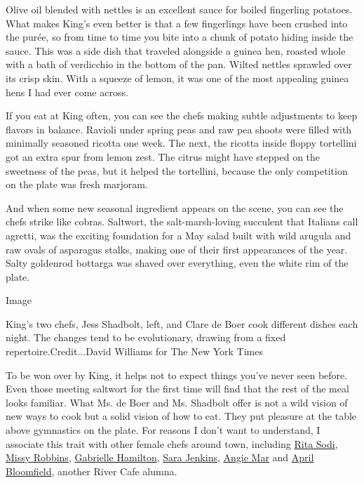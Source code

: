 Olive oil blended with nettles is an excellent sauce for boiled
fingerling potatoes. What makes King's even better is that a few
fingerlings have been crushed into the purée, so from time to time you
bite into a chunk of potato hiding inside the sauce. This was a side
dish that traveled alongside a guinea hen, roasted whole with a bath of
verdicchio in the bottom of the pan. Wilted nettles sprawled over its
crisp skin. With a squeeze of lemon, it was one of the most appealing
guinea hens I had ever come across.

If you eat at King often, you can see the chefs making subtle
adjustments to keep flavors in balance. Ravioli under spring peas and
raw pea shoots were filled with minimally seasoned ricotta one week. The
next, the ricotta inside floppy tortellini got an extra spur from lemon
zest. The citrus might have stepped on the sweetness of the peas, but it
helped the tortellini, because the only competition on the plate was
fresh marjoram.

And when some new seasonal ingredient appears on the scene, you can see
the chefs strike like cobras. Saltwort, the salt-marsh-loving succulent
that Italians call agretti, was the exciting foundation for a May salad
built with wild arugula and raw ovals of asparagus stalks, making one of
their first appearances of the year. Salty goldenrod bottarga was shaved
over everything, even the white rim of the plate.

Image

King's two chefs, Jess Shadbolt, left, and Clare de Boer cook different
dishes each night. The changes tend to be evolutionary, drawing from a
fixed repertoire.Credit...David Williams for The New York Times

To be won over by King, it helps not to expect things you've never seen
before. Even those meeting saltwort for the first time will find that
the rest of the meal looks familiar. What Ms. de Boer and Ms. Shadbolt
offer is not a wild vision of new ways to cook but a solid vision of how
to eat. They put pleasure at the table above gymnastics on the plate.
For reasons I don't want to understand, I associate this trait with
other female chefs around town, including
\href{https://www.nytimes3xbfgragh.onion/2016/04/13/dining/i-sodi-restaurant-review.html}{Rita
Sodi},
\href{https://www.nytimes3xbfgragh.onion/2016/03/30/dining/lilia-restaurant-review.html}{Missy
Robbins},
\href{https://www.nytimes3xbfgragh.onion/2017/05/18/magazine/chowder-soaked-toast-any-chef-would-want-to-claim.html}{Gabrielle
Hamilton},
\href{https://cityroom.blogs.nytimes3xbfgragh.onion/2012/07/03/chefs-picnic-sara-jenkins/}{Sara
Jenkins},
\href{https://www.nytimes3xbfgragh.onion/2016/10/26/dining/beatrice-inn-review.html}{Angie
Mar} and
\href{https://www.nytimes3xbfgragh.onion/2017/02/07/dining/white-gold-butchers-review-april-bloomfield-restaurant.html}{April
Bloomfield}, another River Cafe alumna.

